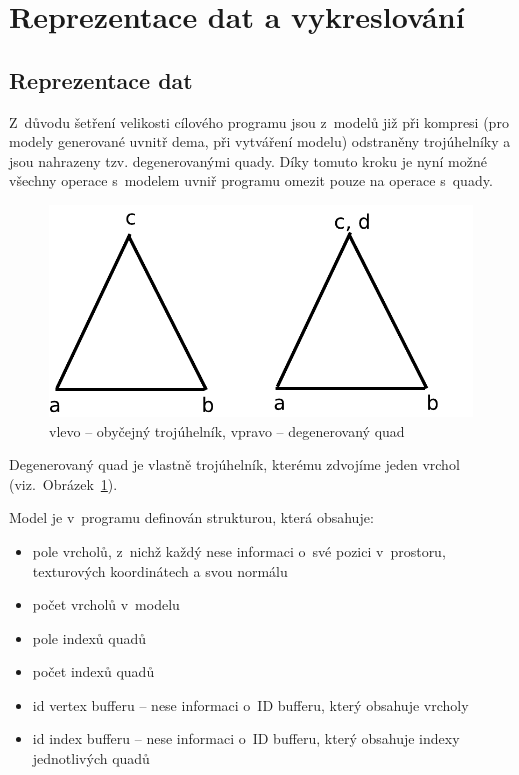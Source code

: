 \section {Reprezentace dat a vykreslování}
\subsection {Reprezentace dat}
Z~důvodu šetření velikosti cílového programu jsou z~modelů již při kompresi (pro modely generované uvnitř dema, při vytváření modelu) odstraněny trojúhelníky a jsou nahrazeny tzv. degenerovanými quady.
Díky tomuto kroku je nyní možné všechny operace s~modelem uvniř programu omezit pouze na operace s~quady.

\begin{figure}[h]
    \begin{center}
      \includegraphics[scale=0.65]{fig/degenQuad} 
      \caption{vlevo -- obyčejný trojúhelník, vpravo -- degenerovaný quad} 
      \label{degQuadFIG}
    \end{center}
\end{figure}

Degenerovaný quad je vlastně trojúhelník, kterému zdvojíme jeden vrchol (viz.~Obrázek~\ref{degQuadFIG}).

Model je v~programu definován strukturou, která obsahuje:
\begin{itemize}
	\item pole vrcholů, z~nichž každý nese informaci o~své pozici v~prostoru, texturových koordinátech a svou normálu
	\item počet vrcholů v~modelu
	\item pole indexů quadů
	\item počet indexů quadů
	\item id vertex bufferu -- nese informaci o~ID bufferu, který obsahuje vrcholy
	\item id index bufferu -- nese informaci o~ID bufferu, který obsahuje indexy jednotlivých quadů
\end{itemize}

